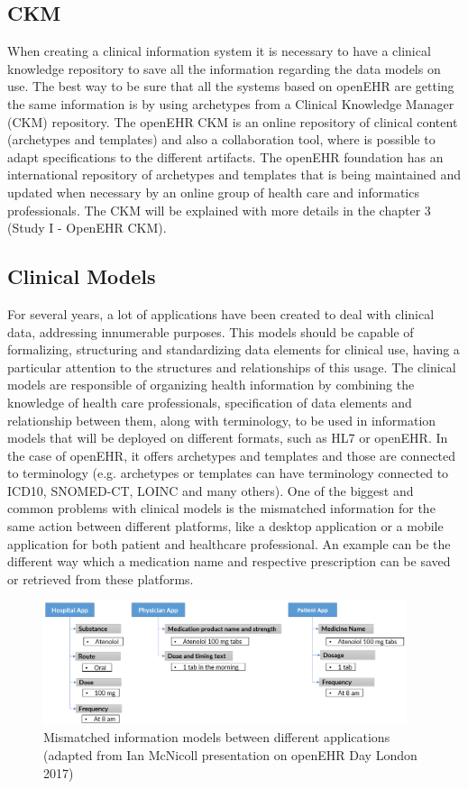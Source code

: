 \documentclass[mim_thesis.tex]{subfiles}
\begin{document}
\subsection{CKM}
When creating a clinical information system it is necessary to have a clinical knowledge repository to save all the information regarding the data models on use. The best way to be sure that all the systems based on openEHR are getting the same information is by using archetypes from a Clinical Knowledge Manager (CKM) repository. The openEHR CKM is an online repository of clinical content (archetypes and templates) and also a collaboration tool, where is possible to adapt specifications to the different artifacts. The openEHR foundation has an international repository of archetypes and templates that is being maintained and updated when necessary by an online group of health care and informatics professionals. The CKM will be explained with more details in the chapter 3 (Study I - OpenEHR CKM).

\subsection{Clinical Models}
For several years, a lot of applications have been created to deal with clinical data, addressing innumerable purposes. This models should be capable of formalizing, structuring and standardizing data elements for clinical use, having a particular attention to the structures and relationships of this usage. The clinical models are responsible of organizing health information by combining the knowledge of health care professionals, specification of data elements and relationship between them, along with terminology, to be used in information models that will be deployed on different formats, such as HL7 or openEHR. In the case of openEHR, it offers archetypes and templates and those are connected to terminology (e.g. archetypes or templates can have terminology connected to ICD10, SNOMED-CT, LOINC and many others). One of the biggest and common problems with clinical models is the mismatched information for the same action between different platforms, like a desktop application or a mobile application for both patient and healthcare professional. An example can be the different way which a medication name and respective prescription can be saved or retrieved from these platforms.

\begin{figure}[H]
	\centering
    \includegraphics[width=0.95\textwidth]{img/mismatched_IM.PNG}
	\caption{Mismatched information models between different applications (adapted from Ian McNicoll presentation on openEHR Day London 2017)}
	\label{fig:mismatched_IM}
\end{figure}
\end{document}
